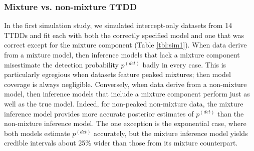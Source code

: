 \documentclass[useAMS,usenatbib,referee,12pt]{article}
\begin{document}
\subsubsection{Mixture vs. non-mixture TTDD}\label{sec:mixture}

In the first simulation study, we simulated intercept-only datasets from 14 TTDDs and fit each with both the correctly specified model and one that was correct except for the mixture component (Table \ref{tbl:sim1}).  When data derive from a mixture model, then inference models that lack a mixture component misestimate the detection probability $p^{(det)}$ badly in every case.  This is particularly egregious when datasets feature peaked mixtures; then model coverage is always negligible.  Conversely, when data derive from a non-mixture model, then inference models that include a mixture component perform just as well as the true model.  Indeed, for non-peaked non-mixture data, the mixture inference model provides more accurate posterior estimates of $p^{(det)}$ than the non-mixture inference model.  The one exception is the exponential case, where both models estimate $p^{(det)}$ accurately, but the mixture inference model yields credible intervals about 25\% wider than those from its mixture counterpart.

\end{document}
